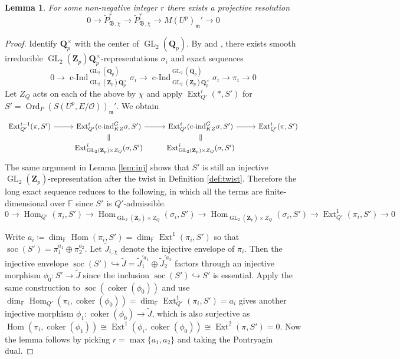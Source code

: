 \documentclass[leqno]{amsart}
\newcommand{\fF}{\mathbb{F}} %
\newcommand{\B}{\mathfrak B}
\DeclareMathOperator{\soc}{soc}
\DeclareMathOperator{\Ord}{Ord}
\DeclareMathOperator{\GL}{GL}
\newcommand{\Qp}{\mathbf{Q}_p}
\newcommand{\Zp}{\mathbf{Z}_p}
\newcommand{\oo}{\mathcal{O}} %
\newcommand{\fm}{\mathfrak{m}}
\DeclareMathOperator{\Hom}{Hom}
\DeclareMathOperator{\Ext}{Ext}
\DeclareMathOperator{\cInd}{c-Ind}
\DeclareMathOperator{\coker}{coker}
\newtheorem{lem}[thm]{Lemma}
\theoremstyle{definition}
\theoremstyle{remark}
\begin{document}
\begin{lem}
	For some non-negative integer $r$
	there exists a projective resolution 
	\begin{equation}\label{eq:resolution}
	0\to \tilde{P}_{\B,\chi}^r\to 
	\tilde{P}_{\B,\chi}^r\to 
	M(U^p)_{\fm}'\to 0
	\end{equation}
\end{lem}
\begin{proof}
Identify $\Qp^\times$ with the center of $\GL_2(\Qp)$.
By \cite[Thm 33]{barthel} and \cite[Thm 19]{barthel}, 
there exists
smooth irreducible 
$\GL_2(\Zp)\Qp^\times$-representations $\sigma_i$
and exact sequences
\begin{equation}
	0\to 
	\cInd_{\GL_2(\Zp)\Qp^\times}^{\GL_2(\Qp)}\sigma_i\to
	\cInd_{\GL_2(\Zp)\Qp^\times}^{\GL_2(\Qp)}\sigma_i\to
	\pi_i\to 0
\end{equation}
Let $Z_Q$ acts on each 
of the above by $\chi$
and apply $\Ext^i_{Q'}(*,S')$
for $S'=\Ord_P(S(U^p,E/\oo))_{\fm}'$.
We obtain
\begin{equation*}
    \begin{tikzcd}[row sep=2ex]
	    \Ext^{i-1}_{Q'}
	    (\pi, S')\arrow[r] &
	    \Ext^{i}_{Q'}(\text{c-ind}_{KZ}^G\sigma, S')
	    \arrow[r] \arrow[d,equal] &
	    \Ext^{i}_{Q'}(\text{c-ind}_{KZ}^G\sigma, S')
	    \arrow[r] \arrow[d,equal] &
	    \Ext^{i}_{Q'}(\pi, S')\\ 
	 & \Ext^i_{\GL_2(\Zp)\times Z_Q}(\sigma ,S') &
	    \Ext^i_{\GL_2(\Zp)\times Z_Q}(\sigma ,S') &
    \end{tikzcd}
\end{equation*}
The same argument in Lemma \ref{lem:inj}
shows that $S'$ is still 
an injective $\GL_2(\Zp)$-representation
after the twist in Definition \ref{def:twist}.
Therefore the long exact sequence reduces to 
the following, in which 
all the terms 
are finite-dimensional over $\fF$
since $S'$ is $Q'$-admissible.
\begin{equation*}
	0 \to \Hom_{Q'}(\pi_i,S')\to 
	\Hom_{\GL_2(\Zp)\times Z_Q}(\sigma_i,S')\to 
	\Hom_{\GL_2(\Zp)\times Z_Q}(\sigma_i,S')\to 
	\Ext^1_{Q'}(\pi_i,S')\to 0
\end{equation*}



Write $a_i\coloneqq \dim_{\fF} \Hom(\pi_i,S')=
\dim_{\fF} \Ext^1(\pi_i,S')$
so that $\soc(S')=\pi_1^{a_1}\oplus \pi_2^{a_2}$.
Let $\tilde{J}_{i,\chi}$ denote 
the injective envelope of $\pi_i$.
Then the injective envelope 
$\soc(S')\hookrightarrow \tilde{J}=\tilde{J}_1^{'a_1}\oplus \tilde{J}_2^{'a_2}$
factors through an injective morphism 
$\phi_0\colon S'\to \tilde{J}$
since the inclusion $\soc(S')\hookrightarrow S'$
is essential.
Apply the same construction 
to $\soc(\coker(\phi_0))$
and use $\dim_{\fF}\Hom_{Q'}(\pi_i, \coker(\phi_0))=
\dim_{\fF}\Ext^1_{Q'}(\pi_i, S')=a_i$
gives another injective morphism
$\phi_1\colon \coker(\phi_0)\to \tilde{J}$,
which is also surjective as 
$\Hom(\pi_i,\coker(\phi_1))
\cong \Ext^1(\phi_i,\coker(\phi_0))
\cong \Ext^2(\pi, S')=0$.
Now the lemma follows by picking
$r=\max\{a_1,a_2\}$ and taking the Pontryagin dual.
\end{proof}
\end{document}
